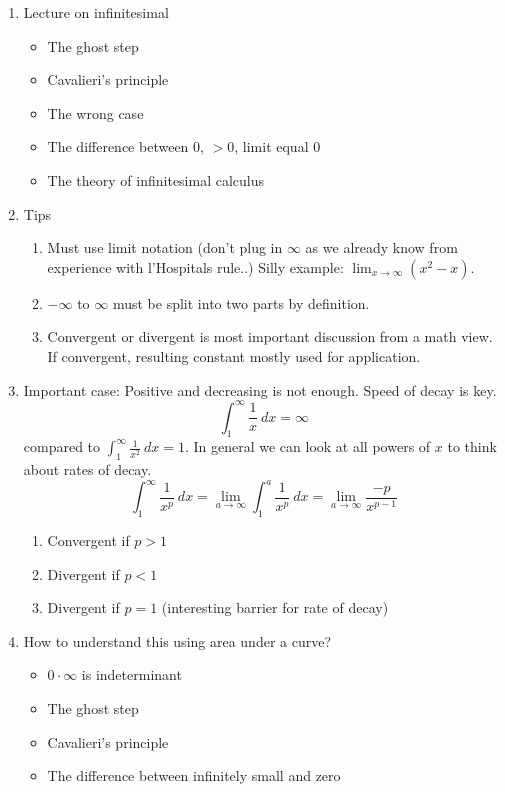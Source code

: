 \documentclass{article}
\newcommand{\ds}{\displaystyle}
\begin{document}
\begin{enumerate}
\item Lecture on infinitesimal
\begin{itemize}
\item The ghost step
\item Cavalieri's principle
\item The wrong case
\item The difference between $0$, $>0$, limit equal $0$
\item The theory of infinitesimal calculus
\end{itemize}

\item Tips
\begin{enumerate}
\item Must use limit notation (don't plug in $\infty$ as we already know from experience with l'Hospitals rule..) Silly example: $\ds \lim_{x\rightarrow \infty} (x^2-x)$.
\item $-\infty$ to $\infty$ must be split into two parts by definition.
\item Convergent or divergent is most important discussion from a math view. If convergent, resulting constant mostly used for application.
\end{enumerate}

\item Important case: Positive and decreasing is not enough. Speed of decay is key.
\[
\int_1^{\infty} \frac{1}{x}~dx = \infty
\]
compared to $\int_1^{\infty} \frac{1}{x^2}~dx=1$.  In general we can look at all powers of $x$ to think about rates of decay.
$$
\int_1^\infty \frac{1}{x^p}~dx=
\lim_{a\rightarrow \infty} \int_1^a \frac{1}{x^p}~dx =
\lim_{a\rightarrow \infty} \frac{-p}{x^{p-1}}
$$
\begin{enumerate}
\item Convergent if $p>1$
\item Divergent if $p<1$
\item Divergent if $p=1$ (interesting barrier for rate of decay)
\end{enumerate}

\item How to understand this using area under a curve?
\begin{itemize}
\item $
0\cdot \infty 
$
is indeterminant
\item The ghost step
\item Cavalieri's principle
\item The difference between infinitely small and zero
\end{itemize}


\end{enumerate}
\end{document}
